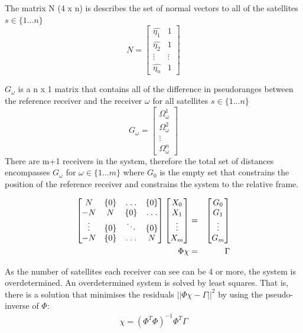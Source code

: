 The matrix N (4 x n) is describes the set of normal vectors to all of the satellites $s\in\{1...n\}$
\begin{equation}
N = \begin{bmatrix}
\hat{\eta_1} & 1\\
\hat{\eta_2} & 1 \\
\vdots & \vdots \\
\hat{\eta_n} & 1
\end{bmatrix}
\end{equation}

$G_\omega$ is a n x 1 matrix that contains all of the difference in pseudoranges between the reference receiver and the receiver $\omega$ for all satellites $s\in\{1...n\}$
\begin{equation}
G_\omega = \begin{bmatrix}
\Omega_\omega^1 \\
\Omega_\omega^2 \\
\vdots\\
\Omega_\omega^n
\end{bmatrix}
\end{equation}
There are m+1 receivers in the system, therefore the total set of distances encompasses   $G_\omega$ for $\omega\in\{1...m\}$ where $G_0$ is the empty set that constrains the position of the reference receiver and constrains the system to the relative frame.

\begin{eqnarray}
\begin{bmatrix}
N & \{0\} & \hdotsfor{1} &\{0\} \\
-N & N  &\{0\} &  \hdotsfor{1} \\
\vdots & \{0\}  & \ddots & \{0\} \\  
-N & \{0\} &  \hdotsfor{1}& N
\end{bmatrix} 
\begin{bmatrix}
X_0 \\
X_1 \\
\vdots \\
X_m
\end{bmatrix} &=& 
\begin{bmatrix}
G_0 \\
G_1 \\
\vdots \\
G_m
\end{bmatrix}\\
\Phi\chi &=& \Gamma
\end{eqnarray}

As the number of satellites each receiver can see can be 4 or more, the system is overdetermined. An overdetermined system is solved by least squares. That is, there is a solution that minimises the residuals $||\Phi\chi-\Gamma||^2$ by using the pseudo-inverse of $\Phi$:
\begin{eqnarray}
\chi = (\Phi^T\Phi)^{-1}\Phi^T\Gamma
\end{eqnarray}

